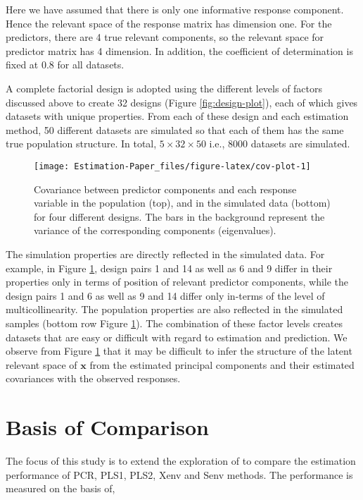 \documentclass[12pt,3p,authoryear]{elsarticle}
\begin{document}
Here we have assumed that there is only one informative response component. Hence the relevant space of the response matrix has dimension one. For the predictors, there are 4 true relevant components, so the relevant space for predictor matrix has 4 dimension. In addition, the coefficient of determination is fixed at 0.8 for all datasets.

A complete factorial design is adopted using the different levels of factors discussed above to create 32 designs (Figure \ref{fig:design-plot}), each of which gives datasets with unique properties. From each of these design and each estimation method, 50 different datasets are simulated so that each of them has the same true population structure. In total, \(5 \times 32 \times 50\) i.e., 8000 datasets are simulated.



\begin{figure}[H]
\texttt{[image: Estimation-Paper\_files/figure-latex/cov-plot-1]} \caption{Covariance between predictor components and each response variable in the population (top), and in the simulated data (bottom) for four different designs. The bars in the background represent the variance of the corresponding components (eigenvalues).}\label{fig:cov-plot}
\end{figure}

The simulation properties are directly reflected in the simulated data. For example, in Figure \ref{fig:cov-plot}, design pairs 1 and 14 as well as 6 and 9 differ in their properties only in terms of position of relevant predictor components, while the design pairs 1 and 6 as well as 9 and 14 differ only in-terms of the level of multicollinearity. The population properties are also reflected in the simulated samples (bottom row Figure \ref{fig:cov-plot}). The combination of these factor levels creates datasets that are easy or difficult with regard to estimation and prediction. We observe from Figure \ref{fig:cov-plot} that it may be difficult to infer the structure of the latent relevant space of \(\mathbf{x}\) from the estimated principal components and their estimated covariances with the observed responses.

\hypertarget{basis-of-comparison}{%
\section{Basis of Comparison}\label{basis-of-comparison}}

The focus of this study is to extend the exploration of \citet{rimal2019pred} to compare the estimation performance of PCR, PLS1, PLS2, Xenv and Senv methods. The performance is measured on the basis of,
\end{document}
